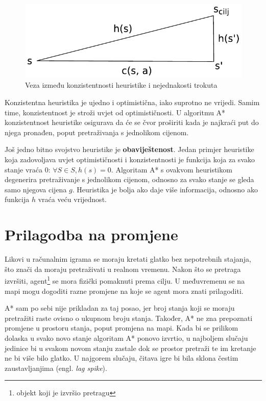 \documentclass[times, utf8, zavrsni, numeric]{fer}
\begin{document}
\begin{figure}[h]
	\centering
	\includegraphics[width=0.5\linewidth]{images/triangleInequality.pdf}
	\caption{Veza između konzistentnosti heuristike i nejednakosti trokuta}
	\label{fig:triangleInequality}
\end{figure} 

\par Konzistentna heuristika je ujedno i optimistična, iako suprotno ne vrijedi. 
Samim time, konzistentnost je stroži uvjet od optimističnosti. 
U algoritmu A* konzistentnost heuristike osigurava da će se čvor proširiti kada je najkraći put do njega pronađen, poput pretraživanja s jednolikom cijenom.

\par Još jedno bitno svojstvo heuristike je \textbf{obaviještenost}. 
Jedan primjer heuristike koja zadovoljava uvjet optimističnosti i konzistentnosti je funkcija koja za svako stanje vraća 0: \(\forall S \in S, h(s) = 0\). 
Algoritam A* s ovakvom heuristikom degenerira pretraživanje s jednolikom cijenom, odnosno za svako stanje se gleda samo njegova cijena \(g\). 
Heuristika je bolja ako daje više informacija, odnosno ako funkcija \(h\) vraća veću vrijednost.

\section{Prilagodba na promjene}\label{sec:adaptation}

\par Likovi u računalnim igrama se moraju kretati glatko bez nepotrebnih stajanja, što znači da moraju pretraživati u realnom vremenu.
Nakon što se pretraga izvršiti, agent\footnote{objekt koji je izvršio pretragu} se mora fizički pomaknuti prema cilju.
U međuvremenu se na mapi mogu dogoditi razne promjene na koje se agent mora znati prilagoditi.

\par A* sam po sebi nije prikladan za taj posao, jer broj stanja koji se moraju pretražiti raste ovisno o ukupnom broju stanja. 
Također, A* ne zna prepoznati promjene u prostoru stanja, poput promjena na mapi. Kada bi se prilikom dolaska u svako novo stanje algoritam A* ponovo izvrtio, u najboljem slučaju jedinice bi u svakom novom stanju zastale dok se prostor pretraži te im kretanje ne bi više bilo glatko. 
U najgorem slučaju, čitava igre bi bila sklona čestim zaustavljanjima (engl. \textit{lag spike}).
\end{document}
